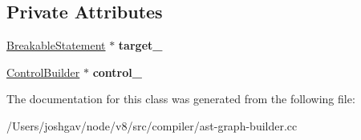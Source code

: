 \subsection*{Private Attributes}
\begin{DoxyCompactItemize}
\item 
\hyperlink{classv8_1_1internal_1_1_breakable_statement}{Breakable\+Statement} $\ast$ {\bfseries target\+\_\+}\hypertarget{classv8_1_1internal_1_1compiler_1_1_ast_graph_builder_1_1_control_scope_for_breakable_a3659e36883e06d91877218b44eb16913}{}\label{classv8_1_1internal_1_1compiler_1_1_ast_graph_builder_1_1_control_scope_for_breakable_a3659e36883e06d91877218b44eb16913}

\item 
\hyperlink{classv8_1_1internal_1_1compiler_1_1_control_builder}{Control\+Builder} $\ast$ {\bfseries control\+\_\+}\hypertarget{classv8_1_1internal_1_1compiler_1_1_ast_graph_builder_1_1_control_scope_for_breakable_afea93175f86bfb110b96485e6300d1db}{}\label{classv8_1_1internal_1_1compiler_1_1_ast_graph_builder_1_1_control_scope_for_breakable_afea93175f86bfb110b96485e6300d1db}

\end{DoxyCompactItemize}


The documentation for this class was generated from the following file\+:\begin{DoxyCompactItemize}
\item 
/\+Users/joshgav/node/v8/src/compiler/ast-\/graph-\/builder.\+cc\end{DoxyCompactItemize}
